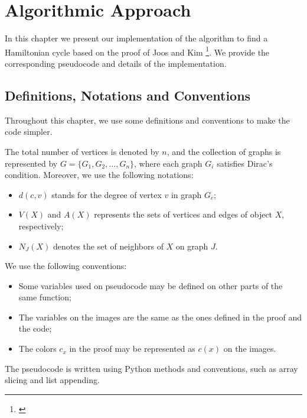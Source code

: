
\chapter{Algorithmic Approach}
\label{chap:algorithmic}

In this chapter we present our implementation of the algorithm to find a Hamiltonian cycle
based on the proof of Joos and Kim \footnote{\cite{Joos_2020}}. We provide the corresponding pseudocode 
and details of the implementation.

\section{Definitions, Notations and Conventions}


Throughout this chapter, we use some definitions and conventions to make the code simpler.

The total number of vertices is denoted by $n$, and the collection of 
graphs is represented by $G = \{G_1, G_2, \dots, G_n\}$, where each graph $G_i$ 
satisfies Dirac's condition. Moreover, we use the following notations:

\begin{itemize}
    \item $d(c, v)$ stands for the degree of vertex $v$ in graph $G_c$;
    \item $V(X)$ and $A(X)$ represents the sets of vertices and edges of object $X$, respectively;
    \item $N_J(X)$ denotes the set of neighbors of $X$ on graph $J$.
\end{itemize}

We use the following conventions:

\begin{itemize}
    \item Some variables used on pseudocode may be defined on other parts of the same function;
    \item The variables on the images are the same as the ones defined in the proof and the code;
    \item The colors $c_x$ in the proof may be represented as $c(x)$ on the images.
\end{itemize}

The pseudocode is written using Python methods and conventions, such as array slicing and 
list appending.

